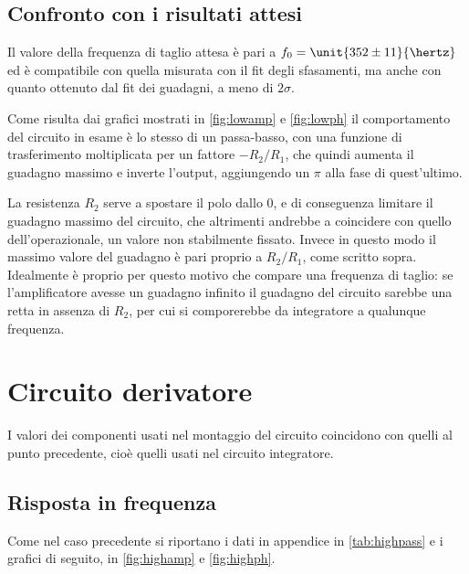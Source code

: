\documentclass[10pt,a4paper]{article}
\begin{document}

\subsection{Confronto con i risultati attesi}

Il valore della frequenza di taglio attesa è pari a $f_0 = \unit{352 \pm 11}{\hertz}$ ed è compatibile con quella misurata con il fit degli sfasamenti, ma anche con quanto ottenuto dal fit dei guadagni, a meno di $2\sigma$.

Come risulta dai grafici mostrati in \figurename{\ref{fig:lowamp}} e  \figurename{\ref{fig:lowph}} il comportamento del circuito in esame è lo stesso di un passa-basso, con una funzione di trasferimento moltiplicata per un fattore $-R_2/R_1$, che quindi aumenta il guadagno massimo e inverte l'output, aggiungendo un $\pi$ alla fase di quest'ultimo.

La resistenza $R_2$ serve a spostare il polo dallo 0, e di conseguenza limitare il guadagno massimo del circuito, che altrimenti andrebbe a coincidere con quello dell'operazionale, un valore non stabilmente fissato. Invece in questo modo il massimo valore del guadagno è pari proprio a  $R_2/R_1$, come scritto sopra.
Idealmente è proprio per questo motivo che compare una frequenza di taglio: se l'amplificatore avesse un guadagno infinito il guadagno del circuito sarebbe una retta in assenza di $R_2$, per cui si comporerebbe da integratore a qualunque frequenza.

\section{Circuito derivatore}

I valori dei componenti usati nel montaggio del circuito coincidono con quelli al punto precedente, cioè quelli usati nel circuito integratore.

\subsection{Risposta in frequenza}

Come nel caso precedente si riportano i dati in appendice in \tablename{\ref{tab:highpass}} e i grafici di seguito, in \figurename{\ref{fig:highamp}} e \figurename{\ref{fig:highph}}.
\end{document}
